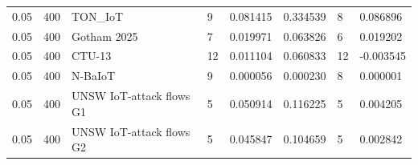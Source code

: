 \begin{tabular}{llllllll}
0.05 & 400 & TON\_IoT & 9 & 0.081415 & 0.334539 & 8 & 0.086896 \\
0.05 & 400 & Gotham 2025 & 7 & 0.019971 & 0.063826 & 6 & 0.019202 \\
0.05 & 400 & CTU-13 & 12 & 0.011104 & 0.060833 & 12 & -0.003545 \\
0.05 & 400 & N-BaIoT & 9 & 0.000056 & 0.000230 & 8 & 0.000001 \\
0.05 & 400 & UNSW IoT-attack flows G1 & 5 & 0.050914 & 0.116225 & 5 & 0.004205 \\
0.05 & 400 & UNSW IoT-attack flows G2 & 5 & 0.045847 & 0.104659 & 5 & 0.002842 \\
\bottomrule
\end{tabular}
